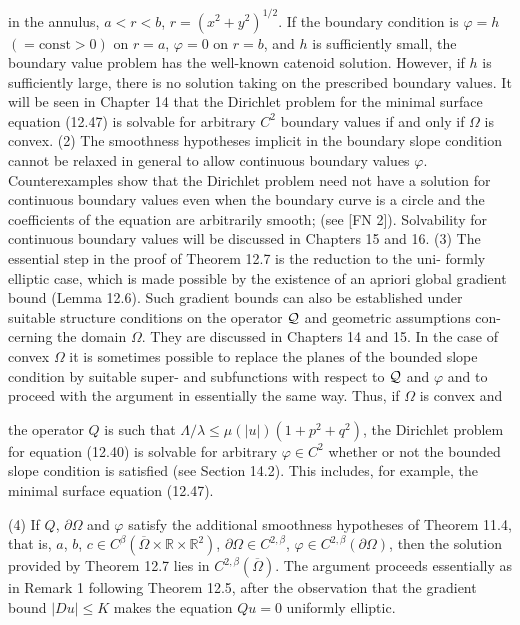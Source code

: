 in the annulus, $a<r<b$, $r=(x^2+y^2)^{1/2}$. If the boundary condition is $\varphi=h$
$(=\mathrm{const}>0)$ on $r=a$, $\varphi=0$ on $r=b$, and $h$ is sufficiently small, the boundary
value problem has the well-known catenoid solution. However, if $h$ is sufficiently
large, there is no solution taking on the prescribed boundary values. It will be seen
in Chapter 14 that the Dirichlet problem for the minimal surface equation (12.47)
is solvable for arbitrary $C^2$ boundary values if and only if $\Omega$ is convex.
(2) The smoothness hypotheses implicit in the boundary slope condition cannot
be relaxed in general to allow continuous boundary values $\varphi$. Counterexamples
show that the Dirichlet problem need not have a solution for continuous boundary
values even when the boundary curve is a circle and the coefficients of the equation
are arbitrarily smooth; (see [FN 2]). Solvability for continuous boundary values
will be discussed in Chapters 15 and 16.
(3) The essential step in the proof of Theorem 12.7 is the reduction to the uni-
formly elliptic case, which is made possible by the existence of an apriori global
gradient bound (Lemma 12.6). Such gradient bounds can also be established under
suitable structure conditions on the operator $\mathcal{Q}$ and geometric assumptions con-
cerning the domain $\Omega$. They are discussed in Chapters 14 and 15. In the case of
convex $\Omega$ it is sometimes possible to replace the planes of the bounded slope
condition by suitable super- and subfunctions with respect to $\mathcal{Q}$ and $\varphi$ and to
proceed with the argument in essentially the same way. Thus, if $\Omega$ is convex and



the operator $Q$ is such that $\Lambda/\lambda \le \mu(|u|)(1 + p^2 + q^2)$, the Dirichlet problem for
equation (12.40) is solvable for arbitrary $\varphi \in C^2$ whether or not the bounded
slope condition is satisfied (see Section 14.2). This includes, for example, the
minimal surface equation (12.47).

\medskip

\noindent (4) If $Q$, $\partial\Omega$ and $\varphi$ satisfy the additional smoothness hypotheses of Theorem
11.4, that is, $a$, $b$, $c \in C^\beta(\overline{\Omega} \times \mathbb{R} \times \mathbb{R}^2)$, $\partial\Omega \in C^{2,\beta}$, $\varphi \in C^{2,\beta}(\partial\Omega)$, then the solution
provided by Theorem 12.7 lies in $C^{2,\beta}(\overline{\Omega})$. The argument proceeds essentially
as in Remark 1 following Theorem 12.5, after the observation that the gradient
bound $|Du| \le K$ makes the equation $Qu=0$ uniformly elliptic.

